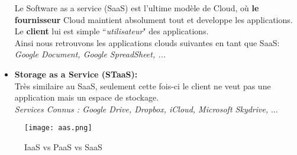 \begin{itemize}
	Le Software as a service (SaaS) est l’ultime modèle de Cloud, où \textbf{le fournisseur} Cloud 
maintient absolument tout et developpe les applications.\\
	
	Le \textbf{client} lui est simple ``\emph{utilisateur}" des applications.\\
	
	Ainsi nous retrouvons les applications clouds suivantes en tant que SaaS: \emph{Google Document, Google SpreadSheet, ... }\\
			\vspace{8mm}

\item \textbf{Storage as a Service (STaaS):}\\

 Très similaire au SaaS, seulement cette fois-ci le client ne veut pas une application mais un espace de stockage.\\
 
 \emph{Services Connus : Google Drive, Dropbox, iCloud, Microsoft Skydrive,} ...

\end{itemize}
			\vspace{2cm}
 
\begin{figure}[H]
    \centering
    \texttt{[image: aas.png]}
	\caption{IaaS vs PaaS vs SaaS}\label{image.aas} 

\end{figure}